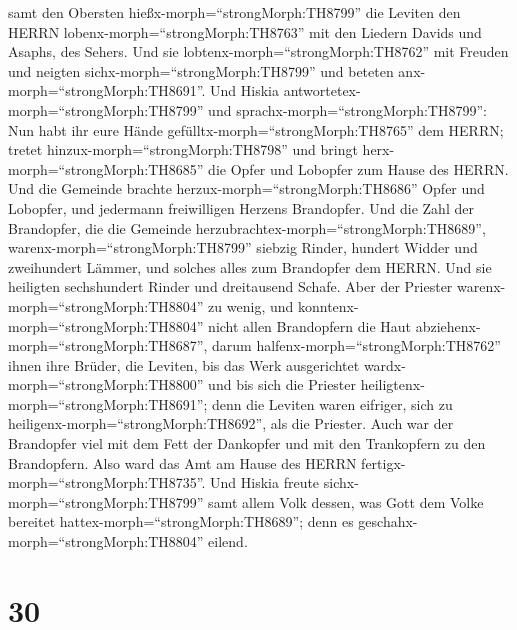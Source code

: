 samt den Obersten hießx-morph=``strongMorph:TH8799'' die Leviten den
HERRN lobenx-morph=``strongMorph:TH8763'' mit den Liedern Davids und
Asaphs, des Sehers. Und sie lobtenx-morph=``strongMorph:TH8762'' mit
Freuden und neigten sichx-morph=``strongMorph:TH8799'' und beteten
anx-morph=``strongMorph:TH8691''.  Und Hiskia
antwortetex-morph=``strongMorph:TH8799'' und
sprachx-morph=``strongMorph:TH8799'': Nun habt ihr eure Hände
gefülltx-morph=``strongMorph:TH8765'' dem HERRN; tretet
hinzux-morph=``strongMorph:TH8798'' und bringt
herx-morph=``strongMorph:TH8685'' die Opfer und Lobopfer zum Hause des
HERRN. Und die Gemeinde brachte herzux-morph=``strongMorph:TH8686''
Opfer und Lobopfer, und jedermann freiwilligen Herzens Brandopfer.
 Und die Zahl der Brandopfer, die die Gemeinde
herzubrachtex-morph=``strongMorph:TH8689'',
warenx-morph=``strongMorph:TH8799'' siebzig Rinder, hundert Widder und
zweihundert Lämmer, und solches alles zum Brandopfer dem HERRN.
 Und sie heiligten sechshundert Rinder und dreitausend
Schafe.  Aber der Priester
warenx-morph=``strongMorph:TH8804'' zu wenig, und
konntenx-morph=``strongMorph:TH8804'' nicht allen Brandopfern die Haut
abziehenx-morph=``strongMorph:TH8687'', darum
halfenx-morph=``strongMorph:TH8762'' ihnen ihre Brüder, die Leviten, bis
das Werk ausgerichtet wardx-morph=``strongMorph:TH8800'' und bis sich
die Priester heiligtenx-morph=``strongMorph:TH8691''; denn die Leviten
waren eifriger, sich zu heiligenx-morph=``strongMorph:TH8692'', als die
Priester.  Auch war der Brandopfer viel mit dem Fett der
Dankopfer und mit den Trankopfern zu den Brandopfern. Also ward das Amt
am Hause des HERRN fertigx-morph=``strongMorph:TH8735''. 
Und Hiskia freute sichx-morph=``strongMorph:TH8799'' samt allem Volk
dessen, was Gott dem Volke bereitet hattex-morph=``strongMorph:TH8689'';
denn es geschahx-morph=``strongMorph:TH8804'' eilend.

\hypertarget{section-29}{%
\section{30}\label{section-29}}

